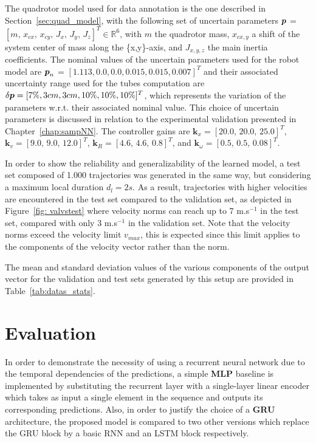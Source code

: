 The quadrotor model used for data annotation is the one described in Section~\ref{sec:quad_model}, with the following set of uncertain parameters $\boldsymbol{p}$ = $[m, \, \allowbreak x_{cx}, \, \allowbreak x_{cy}, \, \allowbreak J_{x}, \, \allowbreak J_{y}, \,\allowbreak J_{z}]^T \in \mathbb{R}^{6}$, with $m$ the quadrotor mass, $x_{cx,y}$ a shift of the system center of mass along the \{x,y\}-axis, and $J_{x,y,z}$ the main inertia coefficients.
The nominal values of the uncertain parameters used for the robot model are $\boldsymbol{p}_{n}$ = $[1.113, \allowbreak0.0, \allowbreak0.0, \allowbreak0.015, \allowbreak0.015, \allowbreak0.007]^T$ and their associated uncertainty range used for the tubes computation are $\delta\boldsymbol{p} = [7\%, \allowbreak3cm, \allowbreak3cm, \allowbreak10\%, \allowbreak10\%, \allowbreak10\%]^T$, which represents the variation of the parameters w.r.t. their associated nominal value.
This choice of uncertain parameters is discussed in relation to the experimental validation presented in Chapter~\ref{chap:sampNN}.
The controller gains are $\boldsymbol{k}_{x} = [20.0, \, 20.0, \, 25.0]^T$, $\boldsymbol{k}_{v}= [9.0, \, 9.0, \, 12.0]^T$, $\boldsymbol{k}_{R}=[4.6, \, 4.6, \, 0.8]^T$, and $\boldsymbol{k}_{\omega}=[0.5, \, 0.5, \, 0.08]^T$.

In order to show the reliability and generalizability of the learned model, a test set composed of 1.000 trajectories was generated in the same way, but considering a maximum local duration $d_l = 2s$.
As a result, trajectories with higher velocities are encountered in the test set compared to the validation set, as depicted in Figure~\ref{fig: valvstest} where velocity norms can reach up to 7 m.s$^{-1}$ in the test set, compared with only 3 m.s$^{-1}$ in the validation set.
Note that the velocity norms exceed the velocity limit $v_{max}$, this is expected since this limit applies to the components of the velocity vector rather than the norm.

The mean and standard deviation values of the various components of the output vector for the validation and test sets generated by this setup are provided in Table~\ref{tab:datas_stats}.

\section{Evaluation}\label{sec:nn_eval}

In order to demonstrate the necessity of using a recurrent neural network due to the temporal dependencies of the predictions, a simple \textbf{MLP} baseline is implemented by substituting the recurrent layer with a single-layer linear encoder which takes as input a single element in the sequence and outputs its corresponding predictions.
Also, in order to justify the choice of a \textbf{GRU} architecture, the proposed model is compared to two other versions which replace the GRU block by a basic RNN \cite{cRNN} and an LSTM \cite{cLSTM} block respectively.

